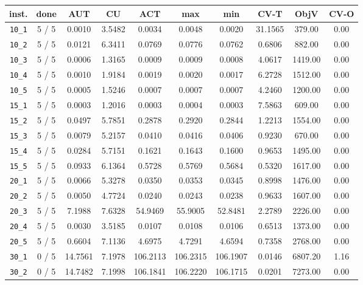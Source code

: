 \begin{table}[h!]
\begin{center}
\small
\begin{tabular}{| c | c | c | c | c | c | c | c | c | c |}
\hline
inst. & done & AUT & CU & ACT & max & min & CV-T & ObjV & CV-O \\
\hline
\verb|10_1| & 5 / 5 & 0.0010 & 3.5482 & 0.0034 & 0.0048 & 0.0020 & 31.1565 & 379.00 & 0.00\\ 
\verb|10_2| & 5 / 5 & 0.0121 & 6.3411 & 0.0769 & 0.0776 & 0.0762 & 0.6806 & 882.00 & 0.00\\ 
\verb|10_3| & 5 / 5 & 0.0006 & 1.3165 & 0.0009 & 0.0009 & 0.0008 & 4.0617 & 1419.00 & 0.00\\ 
\verb|10_4| & 5 / 5 & 0.0010 & 1.9184 & 0.0019 & 0.0020 & 0.0017 & 6.2728 & 1512.00 & 0.00\\ 
\verb|10_5| & 5 / 5 & 0.0005 & 1.5246 & 0.0007 & 0.0007 & 0.0007 & 4.2460 & 1200.00 & 0.00\\ 
\verb|15_1| & 5 / 5 & 0.0003 & 1.2016 & 0.0003 & 0.0004 & 0.0003 & 7.5863 & 609.00 & 0.00\\ 
\verb|15_2| & 5 / 5 & 0.0497 & 5.7851 & 0.2878 & 0.2920 & 0.2844 & 1.2213 & 1554.00 & 0.00\\ 
\verb|15_3| & 5 / 5 & 0.0079 & 5.2157 & 0.0410 & 0.0416 & 0.0406 & 0.9230 & 670.00 & 0.00\\ 
\verb|15_4| & 5 / 5 & 0.0284 & 5.7151 & 0.1621 & 0.1643 & 0.1600 & 0.9653 & 1495.00 & 0.00\\ 
\verb|15_5| & 5 / 5 & 0.0933 & 6.1364 & 0.5728 & 0.5769 & 0.5684 & 0.5320 & 1617.00 & 0.00\\ 
\verb|20_1| & 5 / 5 & 0.0066 & 5.3278 & 0.0350 & 0.0353 & 0.0345 & 0.8998 & 1476.00 & 0.00\\ 
\verb|20_2| & 5 / 5 & 0.0050 & 4.7724 & 0.0240 & 0.0243 & 0.0238 & 0.9633 & 1607.00 & 0.00\\ 
\verb|20_3| & 5 / 5 & 7.1988 & 7.6328 & 54.9469 & 55.9005 & 52.8481 & 2.2789 & 2226.00 & 0.00\\ 
\verb|20_4| & 5 / 5 & 0.0030 & 3.5185 & 0.0107 & 0.0108 & 0.0106 & 0.6513 & 1373.00 & 0.00\\ 
\verb|20_5| & 5 / 5 & 0.6604 & 7.1136 & 4.6975 & 4.7291 & 4.6594 & 0.7358 & 2768.00 & 0.00\\ 
\verb|30_1| & 0 / 5 & 14.7561 & 7.1978 & 106.2113 & 106.2315 & 106.1907 & 0.0146 & 6807.20 & 1.16\\ 
\verb|30_2| & 0 / 5 & 14.7482 & 7.1998 & 106.1841 & 106.2220 & 106.1715 & 0.0201 & 7273.00 & 0.00\\ 

\end{tabular}
\end{center}
\end{table}
